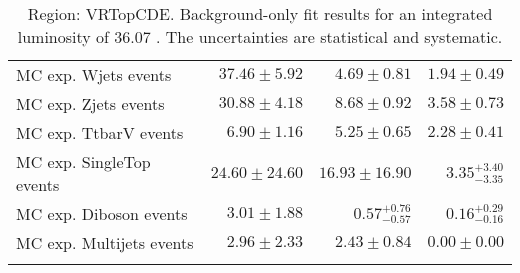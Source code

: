 \begin{table}
\begin{center}
{\begin{tabular*}{\textwidth}{@{\extracolsep{\fill}}lrrr}
        MC exp. Wjets events         & $37.46 \pm 5.92$          & $4.69 \pm 0.81$          & $1.94 \pm 0.49$              \\
        MC exp. Zjets events         & $30.88 \pm 4.18$          & $8.68 \pm 0.92$          & $3.58 \pm 0.73$              \\
        MC exp. TtbarV events         & $6.90 \pm 1.16$          & $5.25 \pm 0.65$          & $2.28 \pm 0.41$              \\
        MC exp. SingleTop events         & $24.60 \pm 24.60$          & $16.93 \pm 16.90$          & $3.35_{-3.35}^{+3.40}$              \\
        MC exp. Diboson events         & $3.01 \pm 1.88$          & $0.57_{-0.57}^{+0.76}$          & $0.16_{-0.16}^{+0.29}$              \\
        MC exp. Multijets events         & $2.96 \pm 2.33$          & $2.43 \pm 0.84$          & $0.00 \pm 0.00$              \\
\noalign{\smallskip}\hline\noalign{\smallskip}
\end{tabular*}
}
\end{center}
\caption{Region: VRTopCDE. Background-only fit results for an integrated luminosity of 36.07 \ifb. The uncertainties are statistical and systematic.
}
\label{table.bkgonly.VRTop}
\end{table}
%
